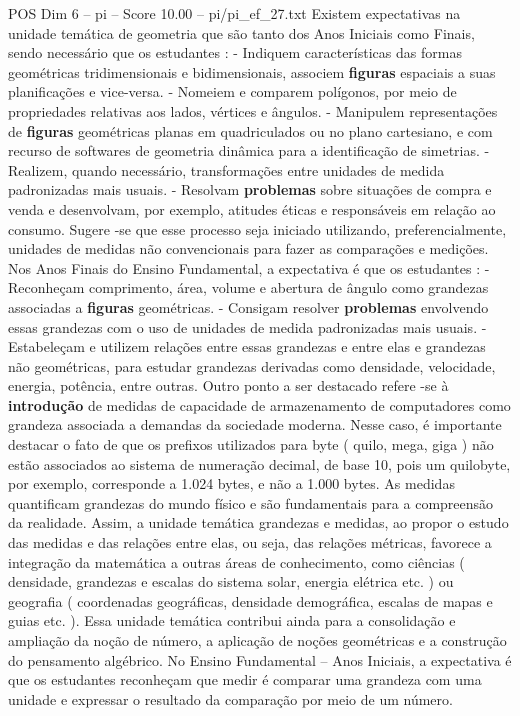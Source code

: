 \begin{textsample}{POS Dim 6 – pi – Score 10.00 – pi/pi\_ef\_27.txt}
Existem expectativas na unidade temática de geometria que são tanto dos Anos Iniciais como Finais, sendo necessário que os estudantes : - Indiquem características das formas geométricas tridimensionais e bidimensionais, associem \textbf{figuras} espaciais a suas planificações e vice-versa. - Nomeiem e comparem polígonos, por meio de propriedades relativas aos lados, vértices e ângulos. - Manipulem representações de \textbf{figuras} geométricas planas em quadriculados ou no plano cartesiano, e com recurso de softwares de geometria dinâmica para a identificação de simetrias. - Realizem, quando necessário, transformações entre unidades de medida padronizadas mais usuais. - Resolvam \textbf{problemas} sobre situações de compra e venda e desenvolvam, por exemplo, atitudes éticas e responsáveis em relação ao consumo.
Sugere -se que esse processo seja iniciado utilizando, preferencialmente, unidades de medidas não convencionais para fazer as comparações e medições.
Nos Anos Finais do Ensino Fundamental, a expectativa é que os estudantes : - Reconheçam comprimento, área, volume e abertura de ângulo como grandezas associadas a \textbf{figuras} geométricas. - Consigam resolver \textbf{problemas} envolvendo essas grandezas com o uso de unidades de medida padronizadas mais usuais. - Estabeleçam e utilizem relações entre essas grandezas e entre elas e grandezas não geométricas, para estudar grandezas derivadas como densidade, velocidade, energia, potência, entre outras.
Outro ponto a ser destacado refere -se à \textbf{introdução} de medidas de capacidade de armazenamento de computadores como grandeza associada a demandas da sociedade moderna.
Nesse caso, é importante destacar o fato de que os prefixos utilizados para byte ( quilo, mega, giga ) não estão associados ao sistema de numeração decimal, de base 10, pois um quilobyte, por exemplo, corresponde a 1.024 bytes, e não a 1.000 bytes.
As medidas quantificam grandezas do mundo físico e são fundamentais para a compreensão da realidade.
Assim, a unidade temática grandezas e medidas, ao propor o estudo das medidas e das relações entre elas, ou seja, das relações métricas, favorece a integração da matemática a outras áreas de conhecimento, como ciências ( densidade, grandezas e escalas do sistema solar, energia elétrica etc. ) ou geografia ( coordenadas geográficas, densidade demográfica, escalas de mapas e guias etc. ).
Essa unidade temática contribui ainda para a consolidação e ampliação da noção de número, a aplicação de noções geométricas e a construção do pensamento algébrico.
No Ensino Fundamental – Anos Iniciais, a expectativa é que os estudantes reconheçam que medir é comparar uma grandeza com uma unidade e expressar o resultado da comparação por meio de um número.

\end{textsample}
